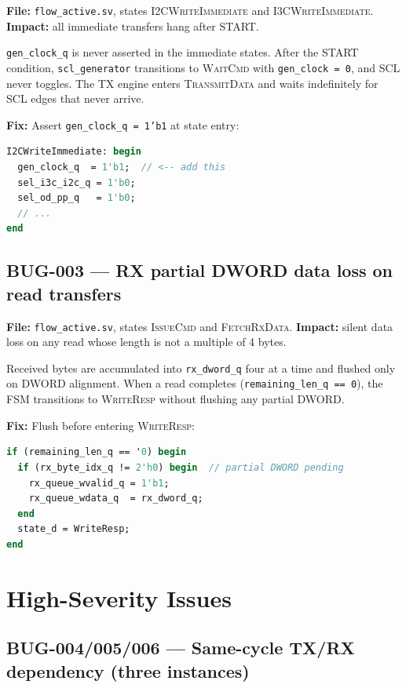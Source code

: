 \documentclass[12pt, a4paper, oneside]{report}
\newcommand{\signal}[1]{\texttt{#1}}
\newcommand{\file}[1]{\texttt{#1}}
\newcommand{\module}[1]{\texttt{#1}}
\newcommand{\state}[1]{\textsc{#1}}
\begin{document}
\textbf{File:} \file{flow\_active.sv}, states \state{I2CWriteImmediate} and
\state{I3CWriteImmediate}. \textbf{Impact:} all immediate transfers hang after START.

\signal{gen\_clock\_q} is never asserted in the immediate states. After the START
condition, \module{scl\_generator} transitions to \state{WaitCmd} with
\signal{gen\_clock\,=\,0}, and SCL never toggles. The TX engine enters
\state{TransmitData} and waits indefinitely for SCL edges that never arrive.

\textbf{Fix:} Assert \signal{gen\_clock\_q\,=\,1'b1} at state entry:

\begin{lstlisting}[language=SystemVerilog]
I2CWriteImmediate: begin
  gen_clock_q  = 1'b1;  // <-- add this
  sel_i3c_i2c_q = 1'b0;
  sel_od_pp_q   = 1'b0;
  // ...
end
\end{lstlisting}

\subsection*{BUG-003 --- RX partial DWORD data loss on read transfers}

\textbf{File:} \file{flow\_active.sv}, states \state{IssueCmd} and
\state{FetchRxData}. \textbf{Impact:} silent data loss on any read whose length
is not a multiple of 4 bytes.

Received bytes are accumulated into \signal{rx\_dword\_q} four at a time and flushed
only on DWORD alignment. When a read completes (\signal{remaining\_len\_q\,==\,0}),
the FSM transitions to \state{WriteResp} without flushing any partial DWORD.

\textbf{Fix:} Flush before entering \state{WriteResp}:

\begin{lstlisting}[language=SystemVerilog]
if (remaining_len_q == '0) begin
  if (rx_byte_idx_q != 2'h0) begin  // partial DWORD pending
    rx_queue_wvalid_q = 1'b1;
    rx_queue_wdata_q  = rx_dword_q;
  end
  state_d = WriteResp;
end
\end{lstlisting}

\section{High-Severity Issues}

\subsection*{BUG-004/005/006 --- Same-cycle TX/RX dependency (three instances)}
\end{document}
